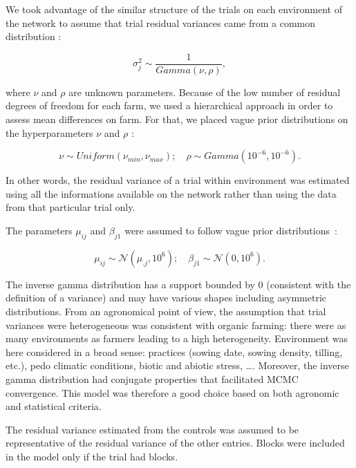 \documentclass{book}\usepackage[]{graphicx}\usepackage[]{color}
\begin{document}
We took advantage of the similar structure of the trials on each environment of the network to assume that trial residual variances came from a common distribution :

\begin{displaymath}
	\sigma^2_{j} \sim \frac{1}{Gamma(\nu,\rho)},
\end{displaymath}

where $\nu$ and $\rho$ are unknown parameters.
Because of the low number of residual degrees of freedom for each farm, we used a hierarchical approach in order to assess mean differences on farm.
For that, we placed vague prior distributions on the hyperparameters $\nu$ and $\rho$ :

\begin{displaymath}
	\nu \sim Uniform(\nu_{min},\nu_{max}) ; \quad \rho \sim Gamma(10^{-6},10^{-6}).
\end{displaymath}


In other words, the residual variance of a trial within environment was estimated using all the informations available on the network rather than using the data from that particular trial only.

The parameters $\mu_{ij}$ and $\beta_{j1}$ were assumed to follow vague prior distributions~:

\begin{displaymath}
	\mu_{ij} \sim \mathcal{N}(\mu_{.j},10^{6}); \quad \beta_{j1} \sim \mathcal{N}(0,10^{6}).
\end{displaymath}


The inverse gamma distribution has a support bounded by 0 (consistent with the definition of a variance) and may have various shapes including asymmetric distributions.
From an agronomical point of view, the assumption that trial variances were heterogeneous was consistent with organic farming: there were as many environments as farmers leading to a high heterogeneity.
Environment was here considered in a broad sense: practices (sowing date, sowing density, tilling, etc.), pedo climatic conditions, biotic and abiotic stress, \dots \citep{desclaux_changes_2008}.
Moreover, the inverse gamma distribution had conjugate properties that facilitated MCMC convergence.
This model was therefore a good choice based on both agronomic and statistical criteria.

The residual variance estimated from the controls was assumed to be representative of the residual variance of the other entries.
Blocks were included in the model only if the trial had blocks.
\end{document}
